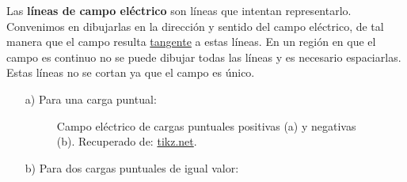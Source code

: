 Las \textbf{líneas de campo eléctrico} son líneas que intentan representarlo. Convenimos en dibujarlas en la dirección y sentido del campo eléctrico, de tal manera que el campo resulta \underline{tangente} a estas líneas. En un región en que el campo es continuo no se puede dibujar todas las líneas y es necesario espaciarlas. Estas líneas no se cortan ya que el campo es único.


\begin{itemize}
\item[a)] Para una carga puntual: 

\begin{figure}[H]
        \centering
         \hspace{1cm}
        \caption{Campo eléctrico de cargas puntuales positivas (a) y negativas (b). Recuperado de: \href{https://tikz.net/electric_fieldlines1/}{tikz.net}. }
        \label{fig:Campo-Cargas-Puntuales-1}
    \end{figure}

\item[b)] Para dos cargas puntuales de igual valor:


\end{itemize}
